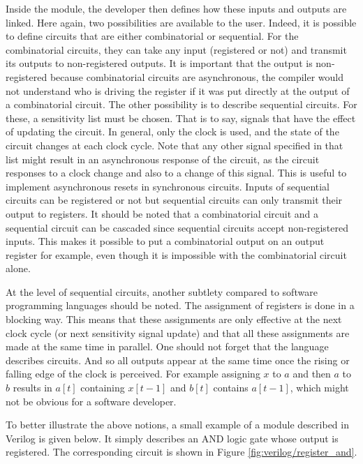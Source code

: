 Inside the module, the developer then defines how these inputs and outputs are linked. Here again, 
two possibilities are available to the user. Indeed, it is possible to define circuits that are 
either combinatorial or sequential. For the combinatorial circuits, they can take any input 
(registered or not) and transmit its outputs to non-registered outputs. It is important that the 
output is non-registered because combinatorial circuits are asynchronous, the compiler would not 
understand who is driving the register if it was put directly at the output of a combinatorial 
circuit. The other possibility is to describe sequential circuits. For these, a sensitivity list 
must be chosen. That is to say, signals that have the effect of updating the circuit. In 
general, only the clock is used, and the state of the circuit changes at each clock cycle. Note that
any other signal specified in that list might result in an asynchronous response of the circuit, as
the circuit responses to a clock change and also to a change of this signal. This is useful to
implement asynchronous resets in synchronous circuits. Inputs of sequential circuits can be registered or
not but sequential circuits can only transmit their output to registers. It should be noted that a combinatorial 
circuit and a sequential circuit can be cascaded since sequential circuits accept non-registered 
inputs. This makes it possible to put a combinatorial output on an output register for example, even
though it is impossible with the combinatorial circuit alone. 

At the level of sequential circuits, another subtlety compared to software programming languages 
should be noted. The assignment of registers is done in a blocking way. This means that these 
assignments are only effective at the next clock cycle (or next sensitivity signal update) and 
that all these assignments are made at the same time in parallel. One should not forget that the 
language describes circuits. And so all outputs appear at the same time once the rising or falling 
edge of the clock is perceived. For example assigning $x$ to $a$ and then $a$ to $b$ results in
$a[t]$ containing $x[t - 1]$ and $b[t]$ contains $a[t - 1]$, which might not be obvious for a software
developer.

To better illustrate the above notions, a small example of a module described in
Verilog is given below.  It simply describes an AND logic gate whose output
is registered. The corresponding circuit is shown in Figure
\ref{fig:verilog/register_and}.

